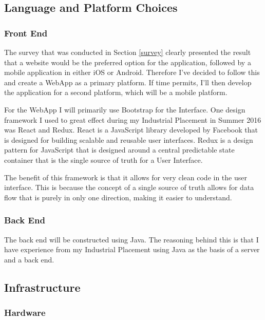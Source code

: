 \documentclass[12pt]{article}
\begin{document}
\subsection{Language and Platform Choices}

\subsubsection{Front End}

The survey that was conducted in Section \ref{survey} clearly presented the result that a website would be the preferred option for the application, followed by a mobile application in either iOS or Android. Therefore I've decided to follow this and create a WebApp as a primary platform. If time permits, I'll then develop the application for a second platform, which will be a mobile platform.

For the WebApp I will primarily use Bootstrap for the Interface. One design framework I used to great effect during my Industrial Placement in Summer 2016 was React and Redux. React is a JavaScript library developed by Facebook that is designed for building scalable and reusable user interfaces. Redux is a design pattern for JavaScript that is designed around a central predictable state container that is the single source of truth for a User Interface. 

The benefit of this framework is that it allows for very clean code in the user interface. This is because the concept of a single source of truth allows for data flow that is purely in only one direction, making it easier to understand.

\subsubsection{Back End}

\label{languagechoice}

The back end will be constructed using Java. The reasoning behind this is that I have experience from my Industrial Placement using Java as the basis of a server and a back end.

\subsection{Infrastructure}

\subsubsection{Hardware}
\end{document}
